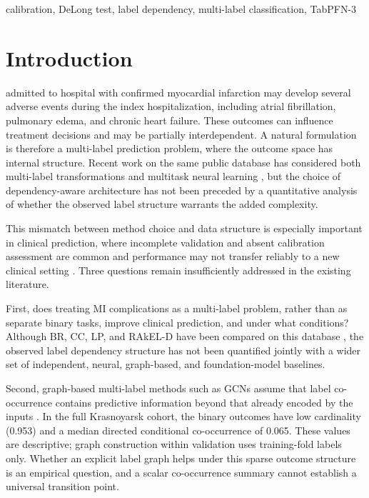 \documentclass{ieeeaccess}
\begin{document}
\begin{keywords}
calibration, DeLong test, label dependency, multi-label classification, TabPFN-3
\end{keywords}

\titlepgskip=-21pt
\maketitle
\raggedbottom

\section{Introduction}
\label{sec:introduction}

 admitted to hospital with confirmed myocardial infarction may develop several adverse events during the index hospitalization, including atrial fibrillation, pulmonary edema, and chronic heart failure. These outcomes can influence treatment decisions and may be partially interdependent. A natural formulation is therefore a multi-label prediction problem, where the outcome space has internal structure. Recent work on the same public database has considered both multi-label transformations and multitask neural learning \cite{elashmawi2024,makhmudov2025}, but the choice of dependency-aware architecture has not been preceded by a quantitative analysis of whether the observed label structure warrants the added complexity.

This mismatch between method choice and data structure is especially important in clinical prediction, where incomplete validation and absent calibration assessment are common and performance may not transfer reliably to a new clinical setting \cite{christodoulou2019,futoma2020}. Three questions remain insufficiently addressed in the existing literature.

First, does treating MI complications as a multi-label problem, rather than as separate binary tasks, improve clinical prediction, and under what conditions? Although BR, CC, LP, and RAkEL-D have been compared on this database \cite{elashmawi2024}, the observed label dependency structure has not been quantified jointly with a wider set of independent, neural, graph-based, and foundation-model baselines.

Second, graph-based multi-label methods such as GCNs assume that label co-occurrence contains predictive information beyond that already encoded by the inputs \cite{chen2019mlgcn,wang2020}. In the full Krasnoyarsk cohort, the binary outcomes have low cardinality (0.953) and a median directed conditional co-occurrence of 0.065. These values are descriptive; graph construction within validation uses training-fold labels only. Whether an explicit label graph helps under this sparse outcome structure is an empirical question, and a scalar co-occurrence summary cannot establish a universal transition point.
\end{document}
